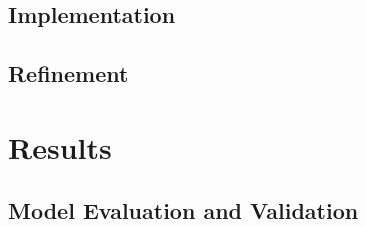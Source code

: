 \documentclass[12pt,a4paper]{article}
\begin{document}
\subsection*{Implementation}
%
\subsection*{Refinement}
%
%
\section{Results}
%
\subsection*{Model Evaluation and Validation}
%
\end{document}
